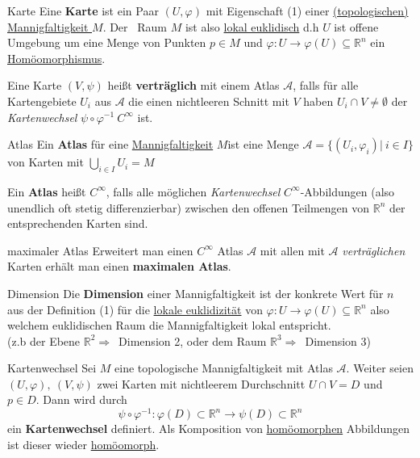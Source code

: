 \begin{titleDef}{Karte}
\label{Karte}
Eine \textbf{Karte} ist ein Paar $(U,\varphi)$ mit Eigenschaft (1) einer \hyperref[Mannigfaltigkeit]{(topologischen) Mannigfaltigkeit $M$}. Der \Toporeflong~Raum $M$ ist also \hyperref[lokaleukldisch]{lokal euklidisch} d.h $U$ ist offene Umgebung um eine Menge von Punkten $p\in M$ und $\varphi:U\to\varphi(U)\subseteq\mathbb{R}^n$ ein \hyperref[homoemorph]{Homöomorphismus}.
\par
\begin{rawDef}
\label{vertraeglich}
Eine Karte $(V,\psi)$ heißt \textbf{verträglich} mit einem Atlas $\mathcal{A}$, falls für alle Kartengebiete $U_i$ aus $\mathcal{A}$ die einen nichtleeren Schnitt mit $V$ haben $U_i\cap V\neq\emptyset$ der \textit{Kartenwechsel} $\psi\circ\varphi^{-1}\: C^\infty$ ist. 
\end{rawDef}
\end{titleDef}

\begin{titleDef}{Atlas}
\label{Atlas}
Ein \textbf{Atlas} für eine \hyperref[Mannigfaltigkeit]{Mannigfaltigkeit} $M$ist eine Menge $\mathcal{A}=\{(U_i,\varphi_i)|\ i\in I\}$ von Karten mit $\bigcup_{i\in I}U_i = M$\par
Ein \textbf{Atlas} heißt $C^\infty$, falls alle möglichen \textit{Kartenwechsel} $C^\infty$-Abbildungen (also unendlich oft stetig differenzierbar) zwischen den offenen Teilmengen von $\mathbb{R}^n$ der entsprechenden Karten sind.
\end{titleDef}

\begin{titleDef}{maximaler Atlas}
\label{maxAtlas}
Erweitert man einen $C^\infty$ Atlas $\mathcal{A}$ mit allen mit $\mathcal{A}$ \textit{verträglichen} Karten erhält man einen \textbf{maximalen Atlas}.
\end{titleDef}

\begin{titleDef}{Dimension}
\label{dimMannigfaltigkeit}
Die \textbf{Dimension} einer Mannigfaltigkeit ist der konkrete Wert für $n$ aus der Definition (1) für die \hyperref[lokaleukldisch]{lokale euklidizität} von $\varphi:U\to\varphi(U)\subseteq\mathbb{R}^n$ also welchem euklidischen Raum die Mannigfaltigkeit lokal entspricht.\\(z.b der Ebene $\mathbb{R}^2 \Rightarrow$~Dimension 2, oder dem Raum $\mathbb{R}^3\Rightarrow$~Dimension 3)
\end{titleDef}

\begin{titleDef}{Kartenwechsel}
\label{Kartenwechsel}
Sei $M$ eine topologische Mannigfaltigkeit mit Atlas $\mathcal{A}$. Weiter seien $(U,\varphi),\ (V,\psi)$ zwei Karten mit nichtleerem Durchschnitt $U\cap V=D$ und $p\in D$.
Dann wird durch 
$$\psi \circ\varphi^{-1}:\varphi(D)\subset\mathbb{R}^n\to\psi(D)\subset\mathbb{R}^n$$
ein \textbf{Kartenwechsel} definiert. Als Komposition von \hyperref[homoemorph]{homöomorphen} Abbildungen ist dieser wieder \hyperref[homoemorph]{homöomorph}.
\end{titleDef}

